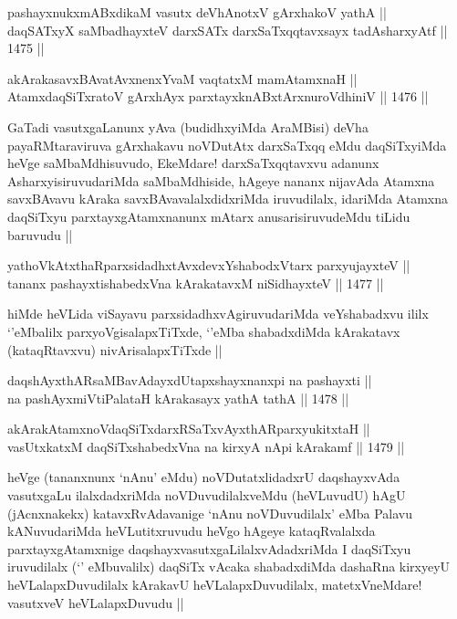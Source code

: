 \begin{shl}
pashayxnukxmABxdikaM vasutx deVhAnotxV gArxhakoV yathA || \\
daqSATxyX saMbadhayxteV darxSATx darxSaTxqqtavxsayx tadAsharxyAtf ||  1475 ||  
\end{shl}
				
\begin{shl}
akArakasavxBAvatAvxnenxYvaM vaqtatxM mamA\s \s tamxnaH ||  \\
AtamxdaqSiTxratoV gArxhAyx parxtayxknABxtArxnuroVdhiniV ||  1476 ||  
\end{shl}

\begin{artha}
GaTadi vasutxgaLanunx yAva (budidhxyiMda AraMBisi) deVha payaRMtaraviruva gArxhakavu noVDutAtx darxSaTxqq eMdu daqSiTxyiMda heVge saMbaMdhisuvudo, EkeMdare! darxSaTxqqtavxvu adanunx AsharxyisiruvudariMda saMbaMdhiside, hAgeye nananx nijavAda Atamxna savxBAvavu kAraka savxBAvavalalxdidxriMda iruvudilalx, idariMda Atamxna daqSiTxyu parxtayxgAtamxnanunx mAtarx anusarisiruvudeMdu tiLidu baruvudu ||
\end{artha}

\begin{shl}
yathoVkAtxthaRparxsidadhxtAvxdevxYshabodxV\s tarx parxyujayxteV || \\
tananx pashayxtishabedxVna kArakatavxM niSidhayxteV ||  1477 ||  
\end{shl}

\begin{artha}
hiMde heVLida viSayavu parxsidadhxvAgiruvudariMda veYshabadxvu ililx `\stext'eMbalilx parxyoVgisalapxTiTxde, `\stext'eMba shabadxdiMda kArakatavx (kataqRtavxvu) nivArisalapxTiTxde ||
\end{artha}

\begin{shl}
daqshAyxthARsaMBavAdayxdUtapxshayxnanxpi na pashayxti ||  \\
na pashAyxmiVtiPalataH kArakasayx yathA tathA ||  1478 ||  
\end{shl}
				
\begin{shl}
akArakAtamxnoV\s daqSiTxdarxRSaTxvAyxthARparxyukitxtaH || \\
vasUtxkatxM daqSiTxshabedxVna na kirxyA nApi kArakamf ||  1479 ||  
\end{shl}

\begin{artha}
heVge (tananxnunx `nAnu' eMdu) noVDutatxlidadxrU daqshayxvAda vasutxgaLu ilalxdadxriMda noVDuvudilalxveMdu (heVLuvudU) hAgU (jAcnxnakekx) katavxRvAdavanige `nAnu noVDuvudilalx' eMba Palavu kANuvudariMda heVLutitxruvudu heVgo hAgeye kataqRvalalxda parxtayxgAtamxnige daqshayxvasutxgaLilalxvAdadxriMda I daqSiTxyu iruvudilalx (`\stext' eMbuvalilx) daqSiTx vAcaka shabadxdiMda dashaRna kirxyeyU heVLalapxDuvudilalx kArakavU heVLalapxDuvudilalx, matetxVneMdare! vasutxveV heVLalapxDuvudu ||
\end{artha}

